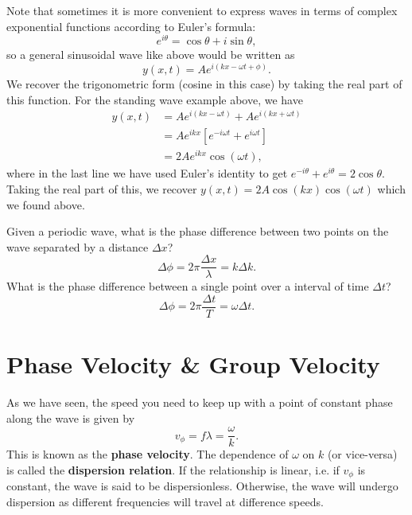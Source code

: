 \documentclass[../classical_mechanics.tex]{subfiles}
\begin{document}
        Note that sometimes it is more convenient to express waves in terms of complex exponential functions according to Euler's formula:
        \begin{equation}
            e^{i\theta}=\cos\theta+i\sin\theta,
        \end{equation}
        so a general sinusoidal wave like above would be written as
        \begin{equation}
            y(x,t)=Ae^{i(kx-\omega t+\phi)}.
        \end{equation}
        We recover the trigonometric form (cosine in this case) by taking the real part of this function.
        For the standing wave example above, we have
        \begin{align}
            y(x,t)&=Ae^{i(kx-\omega t)}+Ae^{i(kx+\omega t)}\\
            &=Ae^{ikx}\left[e^{-i\omega t}+e^{i\omega t}\right]\\
            &=2Ae^{ikx}\cos(\omega t),
        \end{align}
        where in the last line we have used Euler's identity to get $e^{-i\theta}+e^{i\theta}=2\cos\theta$.
        Taking the real part of this, we recover $y(x,t)=2A\cos(kx)\cos(\omega t)$ which we found above.
        \begin{example}
            Given a periodic wave, what is the phase difference between two points on the wave separated by a distance $\Delta x$?
            \begin{equation}
                \Delta\phi=2\pi\frac{\Delta x}{\lambda}=k\Delta k.
            \end{equation}
            What is the phase difference between a single point over a interval of time $\Delta t$?
            \begin{equation}
                \Delta\phi=2\pi\frac{\Delta t}{T}=\omega\Delta t.
            \end{equation}
        \end{example}

    \section{Phase Velocity \& Group Velocity}\label{sec:phase-velocity-and-group-velocity}
        As we have seen, the speed you need to keep up with a point of constant phase along the wave is given by
        \begin{equation}
            v_\phi=f\lambda=\frac{\omega}{k}.
        \end{equation}
        This is known as the \textbf{phase velocity}.
        The dependence of $\omega$ on $k$ (or vice-versa) is called the \textbf{dispersion relation}.
        If the relationship is linear, i.e. if $v_\phi$ is constant, the wave is said to be dispersionless.
        Otherwise, the wave will undergo dispersion as different frequencies will travel at difference speeds.
\end{document}
